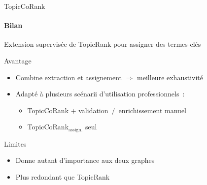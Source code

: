 \begin{frame}{TopicCoRank}\framesubtitle{Bilan}
  Extension supervisée de TopicRank pour assigner des termes-clés

  \vspace{1em}

  \begin{block}{Avantage}
    \begin{itemize}
      \item{Combine extraction et assignement $\Rightarrow$ meilleure
            exhaustivité}
      \item{Adapté à plusieurs scénarii d'utilisation professionnels~:}
      \begin{itemize}
        \item{TopicCoRank + validation~/~enrichissement manuel}
        \item{TopicCoRank$_\text{assign.}$ seul}
      \end{itemize}
    \end{itemize}
  \end{block}

  \vspace{1em}

  \begin{alertblock}{Limites}
    \begin{itemize}
      \item{Donne autant d'importance aux deux graphes}
      \item{Plus redondant que TopicRank}
    \end{itemize}
  \end{alertblock}
\end{frame}

